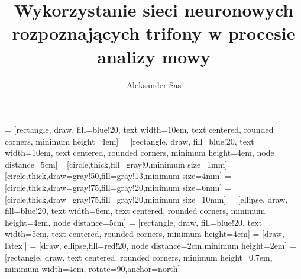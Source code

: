 \documentclass[11pt]{article}
\author{Aleksander Sas}
\title{Wykorzystanie sieci neuronowych rozpoznających trifony w procesie analizy mowy}
\begin{document}
 = [rectangle, draw, fill=blue!20, text width=10em, text centered, rounded corners, minimum height=4em]
 = [rectangle, draw, fill=blue!20, text width=10em, text centered, rounded corners, minimum height=4em, node distance=5cm]
=[circle,thick,fill=gray!0,minimum size=1mm]
=[circle,thick,draw=gray!50,fill=gray!13,minimum size=4mm]
=[circle,thick,draw=gray!75,fill=gray!20,minimum size=6mm]
=[circle,thick,draw=gray!75,fill=gray!20,minimum size=10mm]
 = [ellipse, draw, fill=blue!20, text width=6em, text centered, rounded corners, minimum height=4em, node distance=5cm]
 = [rectangle, draw, fill=blue!20, text width=5em, text centered, rounded corners, minimum height=4em]
 = [draw, -latex']
 = [draw, ellipse,fill=red!20, node distance=2cm,minimum height=2em]
 = [rectangle, draw, text centered, rounded corners, minimum height=0.7em, minimum width=4em, rotate=90,anchor=north]
\maketitle
\tableofcontents
\end{document}
